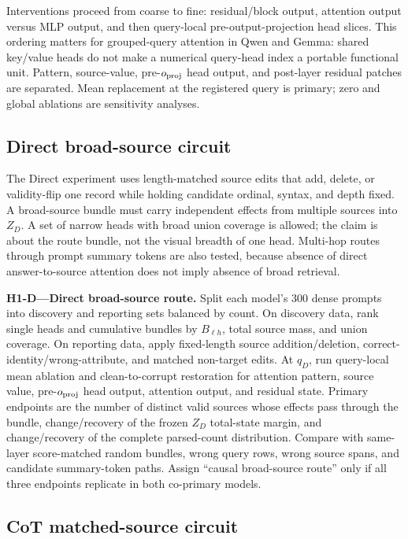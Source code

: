 Interventions proceed from coarse to fine: residual/block output, attention output versus MLP output, and then query-local pre-output-projection head slices. This ordering matters for grouped-query attention in Qwen and Gemma: shared key/value heads do not make a numerical query-head index a portable functional unit. Pattern, source-value, pre-\(o_{\rm proj}\) head output, and post-layer residual patches are separated. Mean replacement at the registered query is primary; zero and global ablations are sensitivity analyses.

\subsection{Direct broad-source circuit}

The Direct experiment uses length-matched source edits that add, delete, or validity-flip one record while holding candidate ordinal, syntax, and depth fixed. A broad-source bundle must carry independent effects from multiple sources into \(Z_D\). A set of narrow heads with broad union coverage is allowed; the claim is about the route bundle, not the visual breadth of one head. Multi-hop routes through prompt summary tokens are also tested, because absence of direct answer-to-source attention does not imply absence of broad retrieval.

\begin{todobox}
\textbf{H1-D---Direct broad-source route.}
Split each model's 300 dense prompts into discovery and reporting sets balanced by count. On discovery data, rank single heads and cumulative bundles by \(B_{\ell h}\), total source mass, and union coverage. On reporting data, apply fixed-length source addition/deletion, correct-identity/wrong-attribute, and matched non-target edits. At \(q_D\), run query-local mean ablation and clean-to-corrupt restoration for attention pattern, source value, pre-\(o_{\rm proj}\) head output, attention output, and residual state. Primary endpoints are the number of distinct valid sources whose effects pass through the bundle, change/recovery of the frozen \(Z_D\) total-state margin, and change/recovery of the complete parsed-count distribution. Compare with same-layer score-matched random bundles, wrong query rows, wrong source spans, and candidate summary-token paths. Assign ``causal broad-source route'' only if all three endpoints replicate in both co-primary models.
\end{todobox}

\subsection{CoT matched-source circuit}

